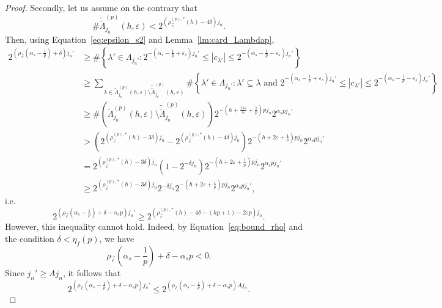 \documentclass[10pt,a4paper]{amsart}
\newcommand{\modu}[1]{\left\vert{#1}\right\vert}
\begin{document}
\begin{proof}
    Secondly, let us assume on the contrary that 
    \[
    \#\widetilde{\widetilde{\Lambda}}_{j_n}^{(p)}(h,\varepsilon) < 2^{\left(\rho_{\vec{c}}^{(p),\ast}(h)-4\delta\right)j_n}.
    \]
    Then, using Equation~\eqref{eq:epsilon_s2} and Lemma~\ref{lm:card_Lambdap},
    \begin{align*}
        2^{\left(\rho_{\vec{c}}\left(\alpha_s-\frac{1}{p}\right)+\delta\right)j_n'} 
        & \geq \#\left\{\lambda'\in\Lambda_{j_n'} :2^{-\left(\alpha_s-\frac{1}{p}+\varepsilon_s\right)j_n'} \leq \modu{c_{\lambda'}} \leq 2^{-\left(\alpha_s-\frac{1}{p}-\varepsilon_s\right)j_n'}\right\} \\
        & \geq \sum_{\lambda\in\widetilde{\Lambda}_{j_n}^{(p)}(h,\varepsilon)\setminus\widetilde{\widetilde{\Lambda}}_{j_n}^{(p)}(h,\varepsilon)}\#\left\{\lambda'\in\Lambda_{j_n'} :\lambda'\subseteq\lambda \text{ and } 2^{-\left(\alpha_s-\frac{1}{p}+\varepsilon_s\right)j_n'} \leq \modu{c_{\lambda'}} \leq 2^{-\left(\alpha_s-\frac{1}{p}-\varepsilon_s\right)j_n'}\right\} \\
        & \geq \#\left(\widetilde{\Lambda}_{j_n}^{(p)}(h,\varepsilon)\setminus\widetilde{\widetilde{\Lambda}}_{j_n}^{(p)}(h,\varepsilon)\right)2^{-\left(h+\frac{11\varepsilon}{6}+\frac{1}{p}\right)pj_n}2^{\alpha_spj_n'} \\
        & > \left(2^{\left(\rho_{\vec{c}}^{(p),\ast}(h)-3\delta\right)j_n}-2^{\left(\rho_{\vec{c}}^{(p),\ast}(h)-4\delta\right)j_n}\right)2^{-\left(h+2\varepsilon+\frac{1}{p}\right)pj_n}2^{\alpha_spj_n'} \\
        & = 2^{\left(\rho_{\vec{c}}^{(p),\ast}(h)-3\delta\right)j_n}\left(1-2^{-\delta j_n}\right)2^{-\left(h+2\varepsilon+\frac{1}{p}\right)pj_n}2^{\alpha_spj_n'} \\
        & \geq 2^{\left(\rho_{\vec{c}}^{(p),\ast}(h)-3\delta\right)j_n}2^{-\delta j_n}2^{-\left(h+2\varepsilon+\frac{1}{p}\right)pj_n}2^{\alpha_spj_n'},
    \end{align*}
    i.e.
    \[
    2^{\left(\rho_{\vec{c}}\left(\alpha_s-\frac{1}{p}\right)+\delta-\alpha_sp\right)j_n'} \geq 2^{\left(\rho_{\vec{c}}^{(p),\ast}(h)-4\delta-(hp+1)-2\varepsilon p\right)j_n}.
    \]
    However, this inequality cannot hold. Indeed, by Equation~\eqref{eq:bound_rho}
and the condition $\delta<\eta_f(p)$, we have
\[
\rho_{\vec{c}}\left(\alpha_s-\frac{1}{p}\right)
+\delta-\alpha_sp<0.
\]
Since $j_n'\geq Aj_n$, it follows that
\[
2^{\left(\rho_{\vec{c}}\left(\alpha_s-\frac{1}{p}\right)
+\delta-\alpha_sp\right)j_n'}
\leq
2^{\left(\rho_{\vec{c}}\left(\alpha_s-\frac{1}{p}\right)
+\delta-\alpha_sp\right)Aj_n}.
\]
\end{proof}
\end{document}
